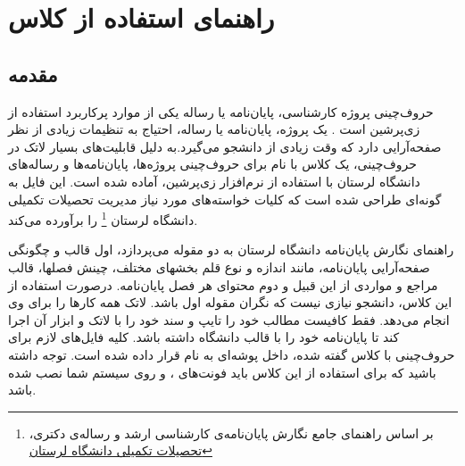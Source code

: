 
\chapter{راهنمای استفاده از کلاس}
\thispagestyle{empty}
\section{مقدمه}
حروف‌چینی پروژه کارشناسی، پایان‌نامه یا رساله یکی از موارد پرکاربرد استفاده از زی‌پرشین است \citep{Khalighi87xepersian}.  یک پروژه، پایان‌نامه یا رساله،  احتیاج به تنظیمات زیادی از نظر صفحه‌آرایی  دارد که وقت زیادی از دانشجو می‌گیرد.به دلیل قابلیت‌های بسیار لاتک در حروف‌چینی، یک کلاس با نام 
 برای حروف‌چینی پروژه‌ها، پایان‌نامه‌ها و رساله‌های دانشگاه  لرستان با استفاده از نرم‌افزار زی‌پرشین،  آماده شده است. این فایل به 
گونه‌ای طراحی شده است که کلیات خواسته‌های مورد نیاز  مدیریت تحصیلات تکمیلی دانشگاه  لرستان
\footnote{بر اساس راهنمای جامع نگارش پایان‌نامه‌ی کارشناسی ارشد و رساله‌ی دکتری، \href{http://ed.lu.ac.ir}{تحصیلات تکمیلی دانشگاه لرستان}}
  را برآورده می‌کند.%

راهنمای نگارش پایان‌نامه دانشگاه  لرستان به دو مقوله می‌پردازد، اول قالب و چگونگی صفحه‌آرایی پایان‌نامه، مانند اندازه و نوع قلم بخشهای مختلف، چینش فصلها، قالب مراجع و مواردی از این قبیل و دوم محتوای هر فصل پایان‌نامه. 
درصورت استفاده از این کلاس، دانشجو  نیازی نیست که نگران مقوله اول باشد. لاتک همه کارها را برای وی انجام می‌دهد. فقط کافیست مطالب خود را تایپ و سند خود را با لاتک و ابزار آن اجرا کند تا پایان‌نامه خود را با قالب دانشگاه داشته باشد.
کلیه فایل‌های لازم برای حروف‌چینی با کلاس گفته شده، داخل پوشه‌ای به نام
  قرار داده شده است. توجه داشته باشید که برای استفاده از این کلاس باید فونت‌های
  ،
 و
    روی سیستم شما نصب شده باشد.
